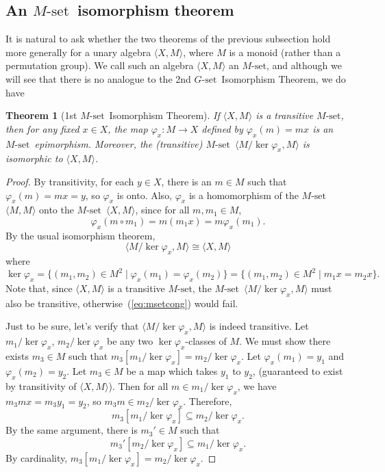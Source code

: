 \documentclass[cm,dissertation]{uhthesis}
\theoremstyle{plain}
\newtheorem{theorem}{Theorem}[section]
\theoremstyle{definition}
\theoremstyle{remark}
\numberwithin{theorem}{section}
\numberwithin{claim}{chapter}
\numberwithin{equation}{section}
\numberwithin{conjecture}{chapter}
\newcommand{\<}{\ensuremath{\langle}}
\renewcommand{\>}{\ensuremath{\rangle}}
\newcommand{\0}{\ensuremath{\mathbf{0}}}
\newcommand{\1}{\ensuremath{\mathbf{1}}}
\newcommand{\2}{\ensuremath{\mathbf{2}}}
\newcommand{\3}{\ensuremath{\mathbf{3}}}
\newcommand{\4}{\ensuremath{\mathbf{4}}}
\newcommand{\5}{\ensuremath{\mathbf{5}}}
\newcommand{\Gset}{\ensuremath{G\text{-set}}}
\newcommand{\Mset}{\ensuremath{M\text{-set}}}
\begin{document}
  \subsection{An \Mset\ isomorphism theorem}
  It is natural to ask whether the two theorems of the previous subsection hold
  more generally for a unary algebra $\<X, M\>$, where $M$ is a monoid (rather
  than a permutation group).  We call such an algebra $\<X, M\>$ an \Mset, and
  although we will see that there is no analogue to the 2nd \Gset\ Isomorphism
  Theorem, we do have 
  \begin{theorem}[1st \Mset\ Isomorphism Theorem]
    If $\<X, M\>$ is a transitive \Mset, then for any fixed
    $x\in X$, the map $\varphi_x : M \rightarrow X$ defined by $\varphi_x(m) = mx$
    is an \Mset\ epimorphism. 
    Moreover, the (transitive) \Mset\ $\<M/\ker \varphi_x, M\>$ is isomorphic to 
    $\<X, M\>$.
  \end{theorem}
  \begin{proof}
    By transitivity, for each $y\in X$, there is an $m\in M$ such
    that $\varphi_x(m) = mx = y$, so $\varphi_x$ is onto.  Also, $\varphi_x$ is a
    homomorphism of the \Mset\ $\<M, M\>$ onto
    the \Mset\ $\<X, M\>$, since for all $m, m_1\in M$,
    \[
    \varphi_x(m\circ m_1) = m(m_1 x) = m \varphi_x(m_1).
    \]
    By the usual isomorphism theorem,
    \begin{equation}
      \label{eq:msetcong}
      \<M/\ker \varphi_x, M\> \cong \<X, M\>
    \end{equation}
    where 
    \[
    \ker \varphi_x = \{(m_1, m_2) \in M^2 \mid \varphi_x(m_1) = \varphi_x(m_2)\} =
    \{(m_1, m_2) \in M^2 \mid m_1 x = m_2 x \}.
    \]
    Note that, since $\<X, M\>$ is a transitive \Mset, the \Mset\ 
    $\<M/\ker \varphi_x, M\>$ must also be transitive, otherwise~(\ref{eq:msetcong}) would
    fail. 

    Just to be sure, let's verify that $\<M/\ker \varphi_x, M\>$ is indeed transitive.
    Let $m_1/\ker\varphi_x$, $m_2/\ker\varphi_x$ be any two $\ker\varphi_x$-classes
    of $M$.  We must show there exists $m_3\in M$ such that 
    $m_3[m_1/\ker\varphi_x]= m_2/\ker\varphi_x$.
    Let $\varphi_x(m_1) = y_1$ and 
    $\varphi_x(m_2) = y_2$.  Let $m_3\in M$ be a map which takes  $y_1$ to $y_2$,
    (guaranteed to exist by transitivity of $\<X, M\>$).  Then for all 
    $m\in m_1/\ker\varphi_x$, we have %
    $m_3mx = m_3y_1 = y_2$, so $m_3m \in m_2/\ker\varphi_x$.  Therefore, 
    \[
    m_3[m_1/\ker\varphi_x]\subseteq  m_2/\ker\varphi_x.
    \]
    By the same argument, there is $m_3'\in M$ such that 
    \[
    m_3'[m_2/\ker\varphi_x]\subseteq  m_1/\ker\varphi_x.
    \]
    By cardinality, $m_3[m_1/\ker\varphi_x]= m_2/\ker\varphi_x$.
  \end{proof}
\end{document}
